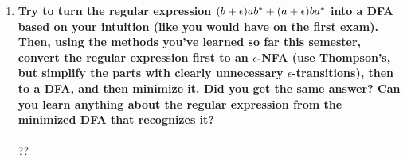 \begin{enumerate}
\begin{figure*}[h]
\end{figure*}

\newpage
\item \textbf{Try to turn the regular expression $(b+\epsilon) ab {}^\ast + (a+ \epsilon) ba {}^\ast$ into a DFA based on your intuition (like you would have on the first exam). Then, using the methods you've learned so far this semester, convert the regular expression first to an $\epsilon$-NFA (use Thompson's, but simplify the parts with clearly unnecessary $\epsilon$-transitions), then to a DFA, and then minimize it. Did you get the same answer? Can you learn anything about the regular expression from the minimized DFA that recognizes it?}
\\\\

??


\end{enumerate}


